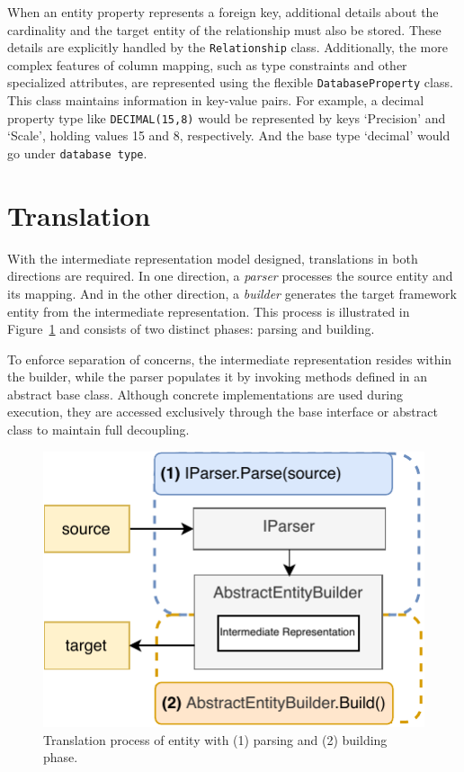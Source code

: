 When an entity property represents a foreign key, additional details about the cardinality and the target entity of the relationship must also be stored. These details are explicitly handled by the \texttt{Relationship} class. Additionally, the more complex features of column mapping, such as type constraints and other specialized attributes, are represented using the flexible \texttt{DatabaseProperty} class. This class maintains information in key-value pairs. For example, a decimal property type like \texttt{DECIMAL(15,8)} would be represented by  keys `Precision' and `Scale', holding values 15 and 8, respectively. And the base type `decimal' would go under \texttt{database type}. 



\section{Translation}

With the intermediate representation model designed, translations in both directions are required. In one direction, a \textit{parser} processes the source entity and its mapping. And in the other direction, a \textit{builder} generates the target framework entity from the intermediate representation. This process is illustrated in Figure~\ref{fig:translation_process} and consists of two distinct phases: parsing and building.

To enforce separation of concerns, the intermediate representation resides within the builder, while the parser populates it by invoking methods defined in an abstract base class. Although concrete implementations are used during execution, they are accessed exclusively through the base interface or abstract class to maintain full decoupling.

\begin{figure}[ht]
  \centering
  \includegraphics[scale=1]{thesis/img/thesis/04_translate_process.drawio.pdf}
  \caption{Translation process of entity with (1) parsing and (2) building phase.}
  \label{fig:translation_process}
\end{figure}

